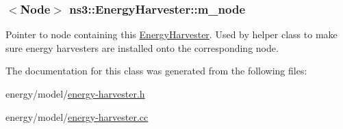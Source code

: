 \subsubsection[{\texorpdfstring{m\+\_\+node}{m_node}}]{$<${\bf Node}$>$ ns3\+::\+Energy\+Harvester\+::m\+\_\+node\hspace{0.3cm}{\ttfamily [private]}}\hypertarget{classns3_1_1EnergyHarvester_a99e7942733d35589dca1a59c425f45f4}{}\label{classns3_1_1EnergyHarvester_a99e7942733d35589dca1a59c425f45f4}
Pointer to node containing this \hyperlink{classns3_1_1EnergyHarvester}{Energy\+Harvester}. Used by helper class to make sure energy harvesters are installed onto the corresponding node. 

The documentation for this class was generated from the following files\+:\begin{DoxyCompactItemize}
\item 
energy/model/\hyperlink{energy-harvester_8h}{energy-\/harvester.\+h}\item 
energy/model/\hyperlink{energy-harvester_8cc}{energy-\/harvester.\+cc}\end{DoxyCompactItemize}
